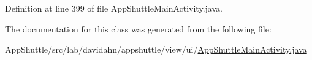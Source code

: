 \-Definition at line 399 of file \-App\-Shuttle\-Main\-Activity.\-java.



\-The documentation for this class was generated from the following file\-:\begin{DoxyCompactItemize}
\item 
\-App\-Shuttle/src/lab/davidahn/appshuttle/view/ui/\hyperlink{_app_shuttle_main_activity_8java}{\-App\-Shuttle\-Main\-Activity.\-java}\end{DoxyCompactItemize}
